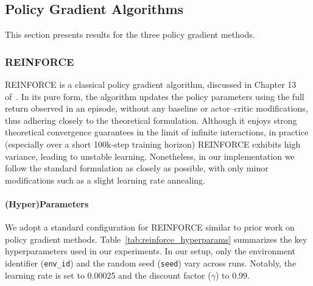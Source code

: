 \subsection{Policy Gradient Algorithms}
This section presents results for the three policy gradient methods.

\subsubsection{REINFORCE}
\label{subsubsec:reinforce}
REINFORCE is a classical policy gradient algorithm, discussed in Chapter 13 of~\cite{sutton:rl}. In its pure form, the algorithm updates the policy parameters using the full return observed in an episode, without any baseline or actor–critic modifications, thus adhering closely to the theoretical formulation. Although it enjoys strong theoretical convergence guarantees in the limit of infinite interactions, in practice (especially over a short 100k-step training horizon) REINFORCE exhibits high variance, leading to unstable learning. Nonetheless, in our implementation we follow the standard formulation as closely as possible, with only minor modifications such as a slight learning rate annealing. 

\paragraph{(Hyper)Parameters}
We adopt a standard configuration for REINFORCE similar to prior work on policy gradient methods. Table~\ref{tab:reinforce_hyperparams} summarizes the key hyperparameters used in our experiments. In our setup, only the environment identifier (\texttt{env\_id}) and the random seed (\texttt{seed}) vary across runs. Notably, the learning rate is set to \num{0.00025} and the discount factor (\(\gamma\)) to \num{0.99}.

